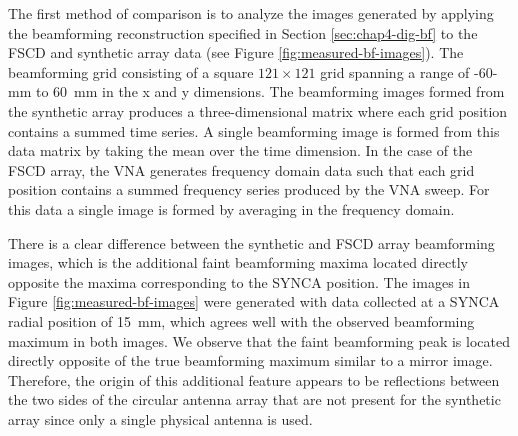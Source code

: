 The first method of comparison is to analyze the images generated by applying the beamforming reconstruction specified in Section \ref{sec:chap4-dig-bf} to the FSCD and synthetic array data (see Figure \ref{fig:measured-bf-images}). The beamforming grid consisting of a square $121\times121$ grid spanning a range of -60-mm to 60~mm in the x and y dimensions. The beamforming images formed from the synthetic array produces a three-dimensional matrix where each grid position contains a summed time series. A single beamforming image is formed from this data matrix by taking the mean over the time dimension. In the case of the FSCD array, the VNA generates frequency domain data such that each grid position contains a summed frequency series produced by the VNA sweep. For this data a single image is formed by averaging in the frequency domain.

There is a clear difference between the synthetic and FSCD array beamforming images, which is the additional faint beamforming maxima located directly opposite the maxima corresponding to the SYNCA position. The images in Figure \ref{fig:measured-bf-images} were generated with data collected at a SYNCA radial position of 15~mm, which agrees well with the observed beamforming maximum in both images. We observe that the faint beamforming peak is located directly opposite of the true beamforming maximum similar to a mirror image. Therefore, the origin of this additional feature appears to be reflections between the two sides of the circular antenna array that are not present for the synthetic array since only a single physical antenna is used.

